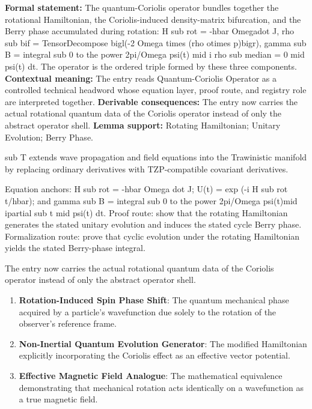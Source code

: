 \begingroup\footnotesize\setlength{\emergencystretch}{3em}\sloppy
\textbf{Formal statement:} The quantum-Coriolis operator bundles together the rotational Hamiltonian, the Coriolis-induced density-matrix bifurcation, and the Berry phase accumulated during rotation: H sub rot = -hbar Omegadot J, rho sub bif = TensorDecompose bigl(-2 Omega times (rho otimes p)bigr), gamma sub B = integral sub 0 to the power 2pi/Omega psi(t) mid i rho sub median = 0 mid psi(t) dt. The operator is the ordered triple formed by these three components. \textbf{Contextual meaning:} The entry reads Quantum-Coriolis Operator as a controlled technical headword whose equation layer, proof route, and registry role are interpreted together. \textbf{Derivable consequences:} The entry now carries the actual rotational quantum data of the Coriolis operator instead of only the abstract operator shell. \textbf{Lemma support:} Rotating Hamiltonian; Unitary Evolution; Berry Phase.\par
\endgroup

sub T extends wave propagation and field equations into the Trawinistic manifold by replacing ordinary derivatives with TZP-compatible covariant derivatives.

Equation anchors: H sub rot = -hbar Omega dot J; U(t) = exp (-i H sub rot t/hbar); and gamma sub B = integral sub 0 to the power 2pi/Omega psi(t)mid ipartial sub t mid psi(t) dt. Proof route: show that the rotating Hamiltonian generates the stated unitary evolution and induces the stated cycle Berry phase. Formalization route: prove that cyclic evolution under the rotating Hamiltonian yields the stated Berry-phase integral.

The entry now carries the actual rotational quantum data of the Coriolis operator instead of only the abstract operator shell.
\endgroup

\begin{enumerate}[leftmargin=1.6em,itemsep=6pt,topsep=4pt]
\item \textbf{Rotation-Induced Spin Phase Shift}: The quantum mechanical phase acquired by a particle's wavefunction due solely to the rotation of the observer's reference frame.
\item \textbf{Non-Inertial Quantum Evolution Generator}: The modified Hamiltonian explicitly incorporating the Coriolis effect as an effective vector potential.
\item \textbf{Effective Magnetic Field Analogue}: The mathematical equivalence demonstrating that mechanical rotation acts identically on a wavefunction as a true magnetic field.
\end{enumerate}

